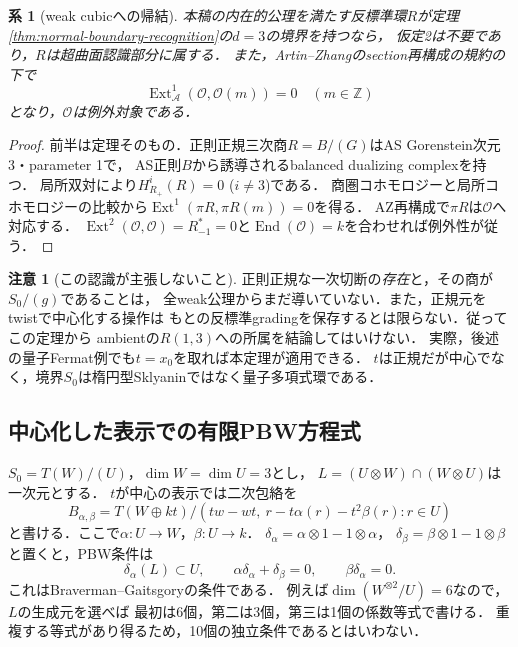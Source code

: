 \documentclass[11pt,a4paper]{ltjsarticle}
\newtheorem{corollary}[theorem]{系}
\theoremstyle{definition}\newtheorem{definition}[theorem]{定義}
\newtheorem{remark}[theorem]{注意}
\newcommand{\OO}{\mathcal O}\newcommand{\cA}{\mathcal A}
\newcommand{\End}{\operatorname{End}}\newcommand{\Hom}{\operatorname{Hom}}\newcommand{\Ext}{\operatorname{Ext}}
\begin{document}
\begin{corollary}[weak cubicへの帰結]\label{cor:boundary-weak}
本稿の内在的公理を満たす反標準環$R$が定理
\ref{thm:normal-boundary-recognition}の$d=3$の境界を持つなら，
仮定2は不要であり，$R$は超曲面認識部分に属する．
また，Artin--Zhangのsection再構成の規約の下で
\[
 \Ext^1_{\cA}(\OO,\OO(m))=0\quad(m\in\mathbb Z)
\]
となり，$\OO$は例外対象である．
\end{corollary}
\begin{proof}
前半は定理そのもの．正則正規三次商$R=B/(G)$はAS Gorenstein次元3・parameter 1で，
AS正則$B$から誘導されるbalanced dualizing complexを持つ．
局所双対により$H^i_{R_+}(R)=0$ ($i\ne3$)である．
商圏コホモロジーと局所コホモロジーの比較から$\Ext^1(\pi R,\pi R(m))=0$を得る．
AZ再構成で$\pi R$は$\OO$へ対応する．
$\Ext^2(\OO,\OO)=R_{-1}^*=0$と$\End(\OO)=k$を合わせれば例外性が従う．
\end{proof}

\begin{remark}[この認識が主張しないこと]
正則正規な一次切断の\emph{存在}と，その商が$S_0/(g)$であることは，
全weak公理からまだ導いていない．また，正規元をtwistで中心化する操作は
もとの反標準gradingを保存するとは限らない．従ってこの定理から
ambientの$R(1,3)$への所属を結論してはいけない．
実際，後述の量子Fermat例でも$t=x_0$を取れば本定理が適用できる．
$t$は正規だが中心でなく，境界$S_0$は楕円型Sklyaninではなく量子多項式環である．
\end{remark}

\subsection{中心化した表示での有限PBW方程式}
$S_0=T(W)/(U)$，$\dim W=\dim U=3$とし，
$L=(U\otimes W)\cap(W\otimes U)$は一次元とする．
$t$が中心の表示では二次包絡を
\[
 B_{\alpha,\beta}=
 T(W\oplus kt)/(tw-wt,\ r-t\alpha(r)-t^2\beta(r):r\in U)
\]
と書ける．ここで$\alpha:U\to W$，$\beta:U\to k$．
$\delta_\alpha=\alpha\otimes1-1\otimes\alpha$，
$\delta_\beta=\beta\otimes1-1\otimes\beta$と置くと，PBW条件は
\begin{equation}\label{eq:bg-conditions}
 \delta_\alpha(L)\subset U,\qquad
 \alpha\delta_\alpha+\delta_\beta=0,\qquad
 \beta\delta_\alpha=0.
\end{equation}
これはBraverman--Gaitsgoryの条件\cite[Theorem 0.5 and \S3]{BG}である．
例えば$\dim(W^{\otimes2}/U)=6$なので，$L$の生成元を選べば
最初は6個，第二は3個，第三は1個の係数等式で書ける．
重複する等式があり得るため，10個の独立条件であるとはいわない．
\end{document}
